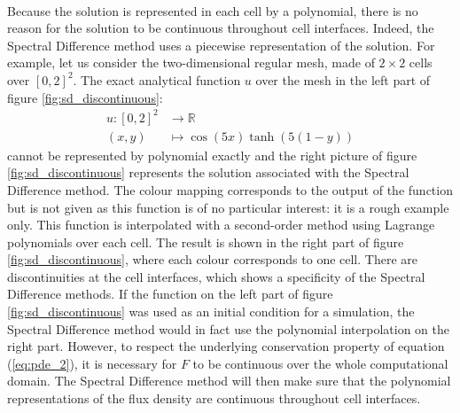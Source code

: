       \paragraph{}
      Because the solution is represented in each cell by a polynomial, there is no reason for the solution to be continuous throughout cell interfaces.
      Indeed, the Spectral Difference method uses a piecewise representation of the solution.
      For example, let us consider the two-dimensional regular mesh, made of $2 \times 2$ cells over $\left[0, 2\right]^2$.
      The exact analytical function $u$ over the mesh in the left part of figure \ref{fig:sd_discontinuous}:
      \begin{equation}
        \begin{aligned}
          u \colon \left[0, 2\right]^2 &\to \mathbb{R}\\
          \left(x, y\right) &\mapsto \cos\left(5x\right) \tanh\left(5\left(1 - y\right)\right)
        \end{aligned}
      \end{equation}
      cannot be represented by polynomial exactly and the right picture of figure \ref{fig:sd_discontinuous} represents the solution associated with the Spectral Difference method.
      The colour mapping corresponds to the output of the function but is not given as this function is of no particular interest: it is a rough example only.
      This function is interpolated with a second-order method using Lagrange polynomials over each cell.
      The result is shown in the right part of figure \ref{fig:sd_discontinuous}, where each colour corresponds to one cell.
      There are discontinuities at the cell interfaces, which shows a specificity of the Spectral Difference methods.
      If the function on the left part of figure \ref{fig:sd_discontinuous} was used as an initial condition for a simulation, the Spectral Difference method would in fact use the polynomial interpolation on the right part.
      However, to respect the underlying conservation property of equation (\ref{eq:pde_2}), it is necessary for $F$ to be continuous over the whole computational domain.
      The Spectral Difference method will then make sure that the polynomial representations of the flux density are continuous throughout cell interfaces.

